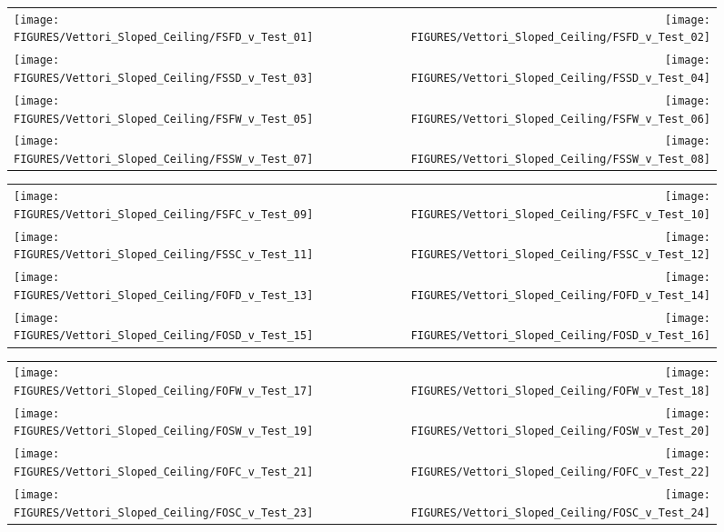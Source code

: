 \begin{figure}[p]
\begin{tabular*}{\textwidth}{l@{\extracolsep{\fill}}r}
\texttt{[image: FIGURES/Vettori\_Sloped\_Ceiling/FSFD\_v\_Test\_01]} &
\texttt{[image: FIGURES/Vettori\_Sloped\_Ceiling/FSFD\_v\_Test\_02]} \\
\texttt{[image: FIGURES/Vettori\_Sloped\_Ceiling/FSSD\_v\_Test\_03]} &
\texttt{[image: FIGURES/Vettori\_Sloped\_Ceiling/FSSD\_v\_Test\_04]} \\
\texttt{[image: FIGURES/Vettori\_Sloped\_Ceiling/FSFW\_v\_Test\_05]} &
\texttt{[image: FIGURES/Vettori\_Sloped\_Ceiling/FSFW\_v\_Test\_06]} \\
\texttt{[image: FIGURES/Vettori\_Sloped\_Ceiling/FSSW\_v\_Test\_07]} &
\texttt{[image: FIGURES/Vettori\_Sloped\_Ceiling/FSSW\_v\_Test\_08]} \\
\end{tabular*}
\label{Vettori_Sloped_1}
\end{figure}


\begin{figure}[p]
\begin{tabular*}{\textwidth}{l@{\extracolsep{\fill}}r}
\texttt{[image: FIGURES/Vettori\_Sloped\_Ceiling/FSFC\_v\_Test\_09]} &
\texttt{[image: FIGURES/Vettori\_Sloped\_Ceiling/FSFC\_v\_Test\_10]} \\
\texttt{[image: FIGURES/Vettori\_Sloped\_Ceiling/FSSC\_v\_Test\_11]} &
\texttt{[image: FIGURES/Vettori\_Sloped\_Ceiling/FSSC\_v\_Test\_12]} \\
\texttt{[image: FIGURES/Vettori\_Sloped\_Ceiling/FOFD\_v\_Test\_13]} &
\texttt{[image: FIGURES/Vettori\_Sloped\_Ceiling/FOFD\_v\_Test\_14]} \\
\texttt{[image: FIGURES/Vettori\_Sloped\_Ceiling/FOSD\_v\_Test\_15]} &
\texttt{[image: FIGURES/Vettori\_Sloped\_Ceiling/FOSD\_v\_Test\_16]} \\
\end{tabular*}
\label{Vettori_Sloped_2}
\end{figure}

\begin{figure}[p]
\begin{tabular*}{\textwidth}{l@{\extracolsep{\fill}}r}
\texttt{[image: FIGURES/Vettori\_Sloped\_Ceiling/FOFW\_v\_Test\_17]} &
\texttt{[image: FIGURES/Vettori\_Sloped\_Ceiling/FOFW\_v\_Test\_18]} \\
\texttt{[image: FIGURES/Vettori\_Sloped\_Ceiling/FOSW\_v\_Test\_19]} &
\texttt{[image: FIGURES/Vettori\_Sloped\_Ceiling/FOSW\_v\_Test\_20]} \\
\texttt{[image: FIGURES/Vettori\_Sloped\_Ceiling/FOFC\_v\_Test\_21]} &
\texttt{[image: FIGURES/Vettori\_Sloped\_Ceiling/FOFC\_v\_Test\_22]} \\
\texttt{[image: FIGURES/Vettori\_Sloped\_Ceiling/FOSC\_v\_Test\_23]} &
\texttt{[image: FIGURES/Vettori\_Sloped\_Ceiling/FOSC\_v\_Test\_24]} \\
\end{tabular*}
\label{Vettori_Sloped_3}
\end{figure}

